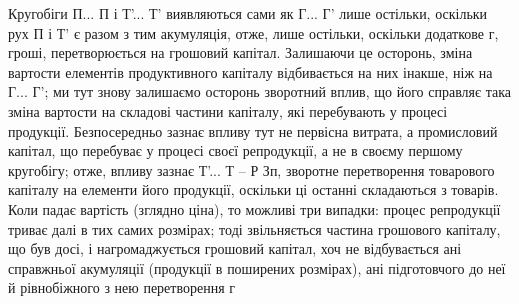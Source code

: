 Кругобіги П... П і Т'... Т' виявляються сами як Г... Г' лише
остільки, оскільки рух П і Т' є разом з тим акумуляція, отже, лише
остільки, оскільки додаткове г, гроші, перетворюється на грошовий капітал.
Залишаючи це осторонь, зміна вартости елементів продуктивного капіталу
відбивається на них інакше, ніж на Г... Г'; ми тут знову залишаємо
осторонь зворотний вплив, що його справляє така зміна вартости на складові
частини капіталу, які перебувають у процесі продукції. Безпосередньо
зазнає впливу тут не первісна витрата, а промисловий капітал, що перебуває
у процесі своєї репродукції, а не в своєму першому кругобігу;
отже, впливу зазнає Т'... Т – Р Зп, зворотне перетворення товарового
капіталу на елементи його продукції, оскільки ці останні складаються з товарів.
Коли падає вартість (зглядно ціна), то можливі три випадки: процес
репродукції триває далі в тих самих розмірах; тоді звільняється частина
грошового капіталу, що був досі, і нагромаджується грошовий капітал,
хоч не відбувається ані справжньої акумуляції (продукції в поширених
розмірах), ані підготовчого до неї й рівнобіжного з нею перетворення г
\parbreak{}  %

